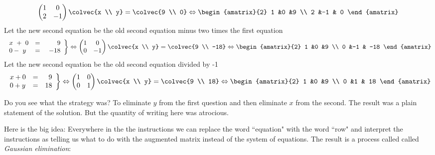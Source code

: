 \begin{example}
\[\begin{pmatrix}
      1             &0  \\
      2             &-1
    \end{pmatrix}
  \colvec{x \\ y}
  =
  \colvec{9 \\ 0}
  \Leftrightarrow
 \begin{amatrix}{2}
1 &0 &9 \\ 2 &-1 & 0
\end{amatrix}
\]
Let the new second equation be the old second equation minus two times the first equation 
\[
   \left.
\begin{array}{lcr}
	x\ +\ 0 & = & 9 \\
	0-\ y & = &\  -18
     \end{array}
   \right\} 
   \Leftrightarrow
    \begin{pmatrix}
      1             &0  \\
      0             &-1
    \end{pmatrix}
  \colvec{x \\ y}
  =
  \colvec{9 \\ -18}
  \Leftrightarrow
 \begin{amatrix}{2}
1 &0 &9 \\ 0 &-1 & -18
\end{amatrix}
\]
Let the new  second equation be the old second equation divided by -1
\[
   \left.
\begin{array}{lcr}
	x + 0 & = & \ 9 \\
	0 + y & = &  18
     \end{array}
   \right\} 
   \Leftrightarrow
    \begin{pmatrix}
      1             &0  \\
      0             &1
    \end{pmatrix}
  \colvec{x \\ y}
  =
  \colvec{9 \\ 18}
  \Leftrightarrow
 \begin{amatrix}{2}
1 &0 &9 \\ 0 &1 & 18
\end{amatrix}
\]
\end{example}
Do you see what the strategy was? To eliminate $y$ from the first question and then eliminate $x$ from the second. The result was a plain statement of the solution. But the quantity of writing here was atrocious. 

Here is the big idea: 
Everywhere in the the instructions we can replace the word ``equation" with the word ``row" and interpret the instructions as telling us what to do with the augmented matrix instead of the system of equations.
The result is a process called called {\itshape Gaussian elimination}: 

